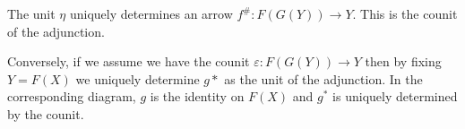 \documentclass{article}
\begin{document}
\begin{enumerate}
\begin{center}
  \end{center}
  The unit $\eta$ uniquely determines an arrow $f^{\#} : F(G(Y)) \rightarrow Y$.
  This is the counit of the adjunction. %

  Conversely, if we assume we have the counit $\varepsilon : F(G(Y)) \rightarrow Y$ then by fixing $Y = F(X)$ we uniquely determine $g*$ as the unit of the adjunction.
  In the corresponding diagram, $g$ is the identity on $F(X)$ and $g^*$ is uniquely determined by the counit.

\end{enumerate}
\end{document}
